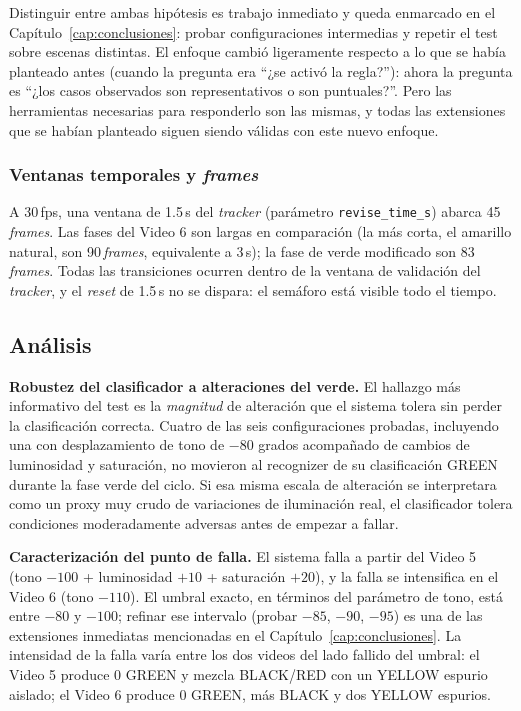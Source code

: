 Distinguir entre ambas hipótesis es trabajo inmediato y queda enmarcado en el Capítulo~\ref{cap:conclusiones}: probar configuraciones intermedias y repetir el test sobre escenas distintas. El enfoque cambió ligeramente respecto a lo que se había planteado antes (cuando la pregunta era ``¿se activó la regla?''): ahora la pregunta es ``¿los casos observados son representativos o son puntuales?''. Pero las herramientas necesarias para responderlo son las mismas, y todas las extensiones que se habían planteado siguen siendo válidas con este nuevo enfoque.

\subsubsection{Ventanas temporales y \textit{frames}}

A 30\,fps, una ventana de 1.5\,s del \textit{tracker} (parámetro \texttt{revise\_time\_s}) abarca 45\,\textit{frames}. Las fases del Video 6 son largas en comparación (la más corta, el amarillo natural, son 90\,\textit{frames}, equivalente a 3\,s); la fase de verde modificado son 83\,\textit{frames}. Todas las transiciones ocurren dentro de la ventana de validación del \textit{tracker}, y el \textit{reset} de 1.5\,s no se dispara: el semáforo está visible todo el tiempo.

\subsection{Análisis}

\textbf{Robustez del clasificador a alteraciones del verde.} El hallazgo más informativo del test es la \textit{magnitud} de alteración que el sistema tolera sin perder la clasificación correcta. Cuatro de las seis configuraciones probadas, incluyendo una con desplazamiento de tono de $-80$ grados acompañado de cambios de luminosidad y saturación, no movieron al recognizer de su clasificación GREEN durante la fase verde del ciclo. Si esa misma escala de alteración se interpretara como un proxy muy crudo de variaciones de iluminación real, el clasificador tolera condiciones moderadamente adversas antes de empezar a fallar.

\textbf{Caracterización del punto de falla.} El sistema falla a partir del Video 5 (tono $-100$ + luminosidad $+10$ + saturación $+20$), y la falla se intensifica en el Video 6 (tono $-110$). El umbral exacto, en términos del parámetro de tono, está entre $-80$ y $-100$; refinar ese intervalo (probar $-85$, $-90$, $-95$) es una de las extensiones inmediatas mencionadas en el Capítulo~\ref{cap:conclusiones}. La intensidad de la falla varía entre los dos videos del lado fallido del umbral: el Video 5 produce 0 GREEN y mezcla BLACK/RED con un YELLOW espurio aislado; el Video 6 produce 0 GREEN, más BLACK y dos YELLOW espurios.

